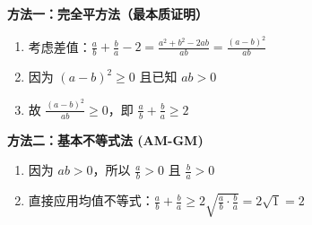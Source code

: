 \begin{proofbox}
\textbf{方法一：完全平方法（最本质证明）}
\begin{enumerate}
    \item 考虑差值：$\frac{a}{b} + \frac{b}{a} - 2 = \frac{a^2 + b^2 - 2ab}{ab} = \frac{(a-b)^2}{ab}$
    \item 因为 $(a-b)^2 \geqslant 0$ 且已知 $ab > 0$
    \item 故 $\frac{(a-b)^2}{ab} \geqslant 0$，即 $\frac{a}{b} + \frac{b}{a} \geqslant 2$
\end{enumerate}

\textbf{方法二：基本不等式法 (AM-GM)}
\begin{enumerate}
    \item 因为 $ab > 0$，所以 $\frac{a}{b} > 0$ 且 $\frac{b}{a} > 0$
    \item 直接应用均值不等式：$\frac{a}{b} + \frac{b}{a} \geqslant 2\sqrt{\frac{a}{b} \cdot \frac{b}{a}} = 2\sqrt{1} = 2$
\end{enumerate}
\end{proofbox}
